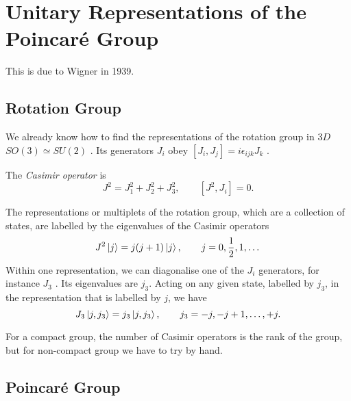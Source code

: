 
\section{Unitary Representations of the Poincaré Group}%
\label{sec:unitary_representations_of_the_poincare_group}

This is due to Wigner in 1939.

\subsection{Rotation Group}%
\label{sub:rotation_group}

We already know how to find the representations of the rotation group in $3D$  $SO(3) \simeq SU(2)$ .
Its generators $J_i$  obey $[J_i, J_j] = i \epsilon_{ijk} J_k$ .
\begin{definition}
  The \emph{Casimir operator} is
  \begin{equation}
    J^2 = J_1^2 + J^2_2 + J^2_3, \qquad [J^2, J_i] = 0.
  \end{equation}
\end{definition}
The representations or multiplets of the rotation group, which are a collection of states, are labelled by the eigenvalues of the Casimir operators
\begin{equation}
  J^2 \ket{j} = j (j + 1) \ket{j}, \qquad j = 0, \frac{1}{2}, 1, \dots
\end{equation}
Within one representation, we can diagonalise one of the $J_i$  generators, for instance $J_3$ . Its eigenvalues are $j_3$. Acting on any given state, labelled by $j_3$, in the representation that is labelled by $j$, we have
 \begin{equation}
  J_3 \ket{j, j_3} = j_3 \ket{j, j_3}, \qquad j_3 = -j, -j+1, \dots, +j.
\end{equation}

\begin{remark}
  For a compact group, the number of Casimir operators is the rank of the group, but for non-compact group we have to try by hand.
\end{remark}

\subsection{Poincaré Group}%
\label{sub:poincare_group}

